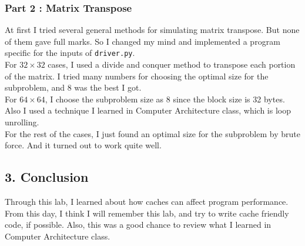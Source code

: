 \documentclass[12pt]{report}
\begin{document}
\subsubsection*{Part 2 : Matrix Transpose}
At first I tried several general methods for simulating matrix transpose. But none of them gave full marks. So I changed my mind and implemented a program specific for the inputs of \texttt{driver.py}.\\
For $32\times 32$ cases, I used a divide and conquer method to transpose each portion of the matrix. I tried many numbers for choosing the optimal size for the subproblem, and 8 was the best I got.\\
For $64\times 64$, I choose the subproblem size as 8 since the block size is 32 bytes. Also I used a technique I learned in Computer Architecture class, which is loop unrolling.\\
For the rest of the cases, I just found an optimal size for the subproblem by brute force. And it turned out to work quite well.

\subsection*{3. Conclusion}
Through this lab, I learned about how caches can affect program performance. From this day, I think I will remember this lab, and try to write cache friendly code, if possible. Also, this was a good chance to review what I learned in Computer Architecture class. 
\end{document}
